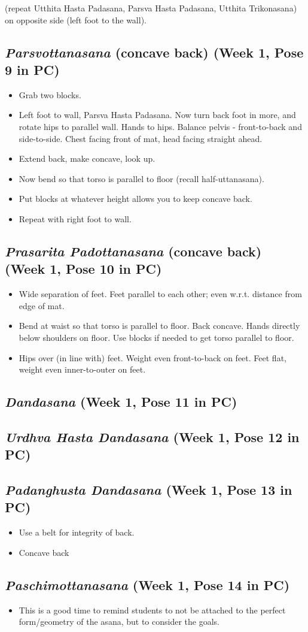 \documentclass{book}
\newcommand{\apose}[1]{\emph{#1}}
\newcommand{\dand}{\apose{Dandasana}}
\newcommand{\padadand}{\apose{Padanghusta Dandasana}}
\newcommand{\parsvo}{\apose{Parsvottanasana}}
\newcommand{\paschi}{\apose{Paschimottanasana}}
\newcommand{\praspad}{\apose{Prasarita Padottanasana}}
\newcommand{\urdhastdand}{\apose{Urdhva Hasta Dandasana}}
\newcommand{\PC}[2]{{\normalfont \hfill(Week #1, Pose #2 in PC)}}
\newcommand{\newpose}[1]{{{#1}}}
\newcounter{pose}
\newcommand{\pose}{\subsection}
\begin{document}
(repeat Utthita Hasta Padasana, Parsva Hasta Padasana, Utthita
Trikonasana) on opposite side (left foot to the wall).

\pose{\newpose{\parsvo} (concave back) \PC{1}{9}}

  \begin{itemize}
  \item Grab two blocks.
  \item Left foot to wall, Parsva Hasta Padasana. Now turn back foot
    in more, and rotate hips to parallel wall. Hands to hips. Balance
    pelvis - front-to-back and side-to-side. Chest facing front of
    mat, head facing straight ahead.
  \item Extend back, make concave, look up.
  \item Now bend so that torso is parallel to floor (recall
    half-uttanasana).
  \item Put blocks at whatever height allows you to keep concave back.
  \item Repeat with right foot to wall.
  \end{itemize}

\pose{\newpose{\praspad} (concave back) \PC{1}{10}}

  \begin{itemize}
  \item Wide separation of feet. Feet parallel to each other; even
    w.r.t. distance from edge of mat.
  \item Bend at waist so that torso is parallel to floor. Back
    concave. Hands directly below shoulders on floor. Use blocks if
    needed to get torso parallel to floor.
  \item Hips over (in line with) feet. Weight even front-to-back on
    feet. Feet flat, weight even inner-to-outer on feet.
  \end{itemize}

\pose{\newpose{\dand}  \PC{1}{11}}

\pose{\newpose{\urdhastdand} \PC{1}{12}}

\pose{\newpose{\padadand} \PC{1}{13}}

  \begin{itemize}
  \item Use a belt for integrity of back.
  \item Concave back
  \end{itemize}

\pose{\newpose{\paschi} \PC{1}{14}}

  \begin{itemize}
  \item This is a good time to remind students to not be attached to
    the perfect form/geometry of the asana, but to consider the goals.
  \end{itemize}
\end{document}

